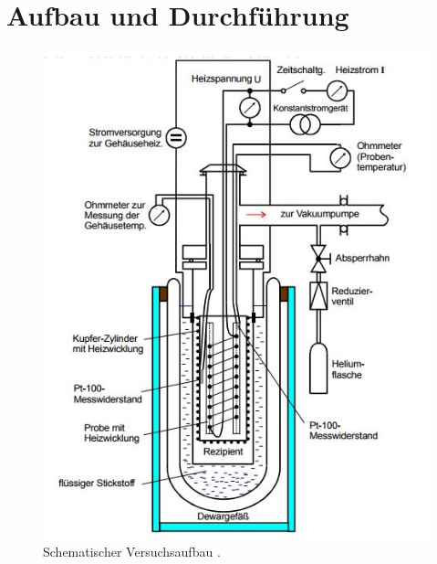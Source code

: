 \section{Aufbau und Durchführung}

\begin{figure}
  \centering
  \includegraphics[scale=0.65]{graphics/Aufbau.jpg}
  \caption{Schematischer Versuchsaufbau \cite{anleitung}.}
  \label{fig:aufbau}
\end{figure}
